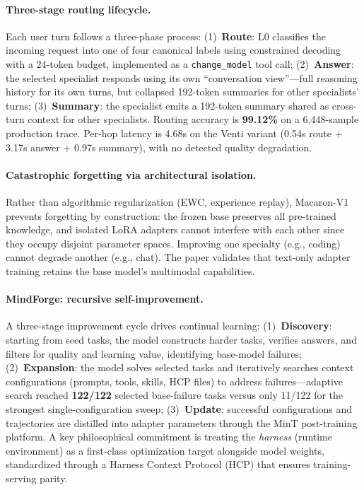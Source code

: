 \documentclass[11pt,a4paper]{article}
\begin{document}
\paragraph{Three-stage routing lifecycle.} Each user turn follows a three-phase process: (1)~\textbf{Route}: L0 classifies the incoming request into one of four canonical labels using constrained decoding with a 24-token budget, implemented as a \texttt{change\_model} tool call; (2)~\textbf{Answer}: the selected specialist responds using its own ``conversation view''---full reasoning history for its own turns, but collapsed 192-token summaries for other specialists' turns; (3)~\textbf{Summary}: the specialist emits a 192-token summary shared as cross-turn context for other specialists. Routing accuracy is \textbf{99.12\%} on a 6{,}448-sample production trace. Per-hop latency is 4.68s on the Venti variant (0.54s route + 3.17s answer + 0.97s summary), with no detected quality degradation.

\paragraph{Catastrophic forgetting via architectural isolation.} Rather than algorithmic regularization (EWC, experience replay), Macaron-V1 prevents forgetting by construction: the frozen base preserves all pre-trained knowledge, and isolated LoRA adapters cannot interfere with each other since they occupy disjoint parameter spaces. Improving one specialty (e.g., coding) cannot degrade another (e.g., chat). The paper validates that text-only adapter training retains the base model's multimodal capabilities.

\paragraph{MindForge: recursive self-improvement.} A three-stage improvement cycle drives continual learning: (1)~\textbf{Discovery}: starting from seed tasks, the model constructs harder tasks, verifies answers, and filters for quality and learning value, identifying base-model failures; (2)~\textbf{Expansion}: the model solves selected tasks and iteratively searches context configurations (prompts, tools, skills, HCP files) to address failures---adaptive search reached \textbf{122/122} selected base-failure tasks versus only 11/122 for the strongest single-configuration sweep; (3)~\textbf{Update}: successful configurations and trajectories are distilled into adapter parameters through the MinT post-training platform. A key philosophical commitment is treating the \emph{harness} (runtime environment) as a first-class optimization target alongside model weights, standardized through a Harness Context Protocol (HCP) that ensures training-serving parity.
\end{document}
